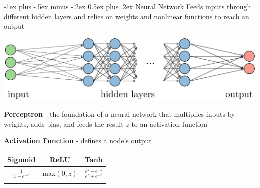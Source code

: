 \documentclass[10pt,landscape]{article}
\makeatletter
\renewcommand{\section}{\@startsection{section}{1}{0mm}%
                                {-1ex plus -.5ex minus -.2ex}%
                                {0.5ex plus .2ex}%
                                {\normalfont\large\bfseries}}
\makeatother
\begin{document}
\begin{multicols}{3}
\section{Neural Network}
Feeds inputs through different hidden layers and relies on weights and nonlinear functions to reach an output
\vspace{-1mm}
\begin{center}
    \includegraphics[scale = .11]{images/nn3.JPG}
\end{center}
\vspace{-1mm}
\textbf{Perceptron} - the foundation of a neural network that multiplies inputs by weights, adds bias, and feeds the result $z$ to an activation function

\textbf{Activation Function} - defines a node's output

\vspace{-1mm}
\begin{center}
\begin{tabular}{c|c|c}
          Sigmoid & ReLU & Tanh\\
         \hline
         \rule{0pt}{3ex}
         $\frac{1}{1+e^{-z}} $  & max$(0,z)$ & $\frac{e^z - e^{-z}}{e^z + e^{-z}}$\\
           &   &  \vspace{-2mm}\\


\end{tabular}
\end{center}
\end{multicols}
\end{document}
